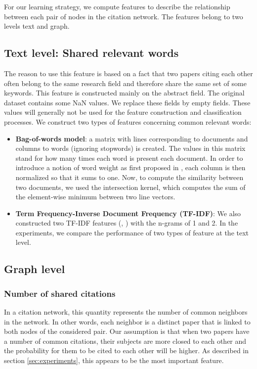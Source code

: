 \documentclass{article}
\begin{document}
For our learning strategy, we compute features to describe the relationship between each pair of nodes in the citation network. The features belong to two levels text and graph.

\subsection{Text level: Shared relevant words}

The reason to use this feature is based on a fact that two papers citing each other often belong to the same research field and therefore share the same set of some keywords. This feature is constructed mainly on the abstract field. The original dataset contains some NaN values. We replace these fields by empty fields. These values will generally not be used for the feature construction and classification processes. We construct two types of features concerning common relevant words:
\begin{itemize}
\item \textbf{Bag-of-words model}: a matrix with lines corresponding to documents and columns to words (ignoring stopwords) is created. The values in this matrix stand for how many times each word is present each document. In order to introduce a notion of word weight as first proposed in \cite{sparck1972statistical}, each column is then normalized so that it sums to one. Now, to compute the similarity between two documents, we used the intersection kernel, which computes the sum of the element-wise minimum between two line vectors.
\item \textbf{Term Frequency-Inverse Document Frequency (TF-IDF)}: We also constructed two TF-IDF features (\cite{Singhal:1996}, \cite{Wu:2008}) with the n-grams of 1 and 2. In the experiments, we compare the performance of two types of feature at the text level.
\end{itemize}
\subsection{Graph level}
\subsubsection{Number of shared citations}

In a citation network, this quantity represents the number of common neighbors in the network. In other words, each neighbor is a distinct paper that is linked to both nodes of the considered pair. Our assumption is that when two papers have a number of common citations, their subjects are more closed to each other and the probability for them to be cited to each other will be higher. As described in section \ref{sec:experiments}, this appears to be the most important feature.
\end{document}
